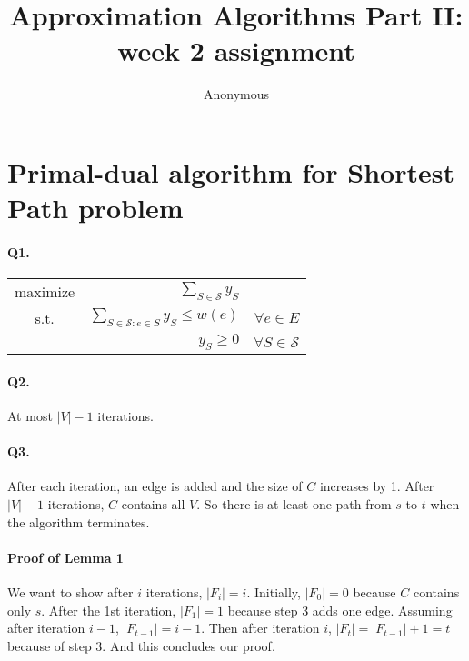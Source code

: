 \documentclass{article}
\begin{document}
\title{Approximation Algorithms Part II: week 2 assignment}
\author{Anonymous}

\maketitle

\newcommand{\abs}[1]{|#1|}
\newcommand{\val}{\text{val}}

\section*{Primal-dual algorithm for Shortest Path problem}

\paragraph{Q1. }

\begin{tabular}{crr}
  maximize  & $\sum_{S \in \mathcal{S}} y_S$ & \\
  s.t.      & $\sum_{S \in \mathcal{S}: e \in S} y_S \le w(e)$ & $\forall e \in E$ \\
            & $y_S \ge 0$ & $\forall S \in \mathcal{S}$
\end{tabular}

\paragraph{Q2. }

At most $|V|-1$ iterations.

\paragraph{Q3. }

After each iteration, an edge is added and the size of $C$ increases by 1.
After $|V|-1$ iterations, $C$ contains all $V$.
So there is at least one path from $s$ to $t$ when the algorithm terminates. 

\paragraph{Proof of Lemma 1}

We want to show after $i$ iterations, $\abs{F_i}=i$. 
Initially, $\abs{F_0}=0$ because $C$ contains only $s$. 
After the 1st iteration, $\abs{F_1}=1$ because step 3 adds one edge.
Assuming after iteration $i-1$, $\abs{F_{t-1}}=i-1$.
Then after iteration $i$, $\abs{F_t}=\abs{F_{t-1}}+1=t$ because of step 3.
And this concludes our proof.
\end{document}
